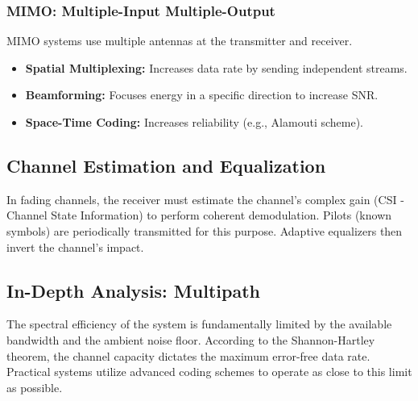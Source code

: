 \subsubsection{MIMO: Multiple-Input Multiple-Output}
MIMO systems use multiple antennas at the transmitter and receiver.
\begin{itemize}
    \item \textbf{Spatial Multiplexing:} Increases data rate by sending independent streams.
    \item \textbf{Beamforming:} Focuses energy in a specific direction to increase SNR.
    \item \textbf{Space-Time Coding:} Increases reliability (e.g., Alamouti scheme).
\end{itemize}

\begin{center}
\end{center}

\subsection{Channel Estimation and Equalization}
In fading channels, the receiver must estimate the channel's complex gain (CSI - Channel State Information) to perform coherent demodulation. Pilots (known symbols) are periodically transmitted for this purpose. Adaptive equalizers then invert the channel's impact.

\subsection{In-Depth Analysis: Multipath}
The spectral efficiency of the system is fundamentally limited by the available bandwidth and the ambient noise floor. According to the Shannon-Hartley theorem, the channel capacity dictates the maximum error-free data rate. Practical systems utilize advanced coding schemes to operate as close to this limit as possible.

